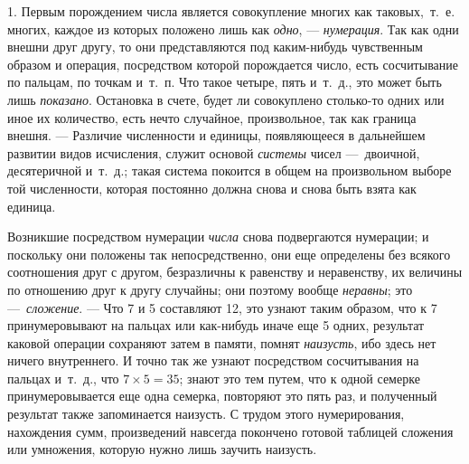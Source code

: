 1. Первым порождением числа является совокупление многих как таковых,~т.~е.
многих, каждое из которых положено лишь как {\em одно},
— {\em нумерация}. Так как одни внешни друг другу, то
они представляются под каким-нибудь чувственным образом и операция,
посредством которой порождается число, есть сосчитывание по пальцам, по
точкам и~т.~п. Что такое четыре, пять и~т.~д., это может быть лишь
{\em показано}. Остановка в счете, будет ли совокуплено
столько-то одних или иное их количество, есть нечто случайное,
произвольное, так как граница внешня. — Различие численности и единицы,
появляющееся в дальнейшем развитии видов исчисления, служит основой
{\em системы} чисел —~двоичной, десятеричной и~т.~д.;
такая система покоится в общем на произвольном выборе той численности,
которая постоянно должна снова и снова быть взята как единица.

Возникшие посредством нумерации {\em числа} снова
подвергаются нумерации; и поскольку они положены так непосредственно, они
еще определены без всякого соотношения друг с другом, безразличны к
равенству и неравенству, их величины по отношению друг к другу случайны;
они поэтому вообще {\em неравны}; это
—~{\em сложение}. — Что 7 и 5 составляют 12, это узнают
таким образом, что к 7 принумеровывают на пальцах или как-нибудь иначе еще
5 одних, результат каковой операции сохраняют затем в памяти, помнят
{\em наизусть}, ибо здесь нет ничего внутреннего. И
точно так же узнают посредством сосчитывания на пальцах и~т.~д., что
$7 \times 5 = 35$; знают это тем путем, что к одной семерке
принумеровывается еще
одна семерка, повторяют это пять раз, и полученный результат также
запоминается наизусть. С трудом этого нумерирования, нахождения сумм,
произведений навсегда покончено готовой таблицей сложения или умножения,
которую нужно лишь заучить наизусть.

